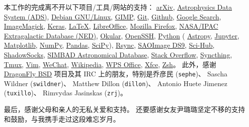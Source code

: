 \begin{thanks}
本工作的完成离不开以下项目/工具/网站的支持：
\href{https://arxiv.org/}{arXiv},
\href{http://ads.harvard.edu/}{Astrophysics Data System (ADS)},
\href{https://www.debian.org/}{Debian GNU/Linux},
\href{https://www.gimp.org/}{GIMP},
\href{https://git-scm.com/}{Git},
\href{https://github.com/}{Github},
\href{https://www.google.com/}{Google Search},
\href{https://imagemagick.org/}{ImageMagick},
\href{https://keras.io/}{Keras},
\href{https://www.latex-project.org/}{\LaTeX},
\href{https://www.libreoffice.org/}{LibreOffice},
\href{https://www.mozilla.org/en-US/firefox/}{Mozilla Firefox},
\href{https://ned.ipac.caltech.edu/}{NASA/IPAC Extragalactic Database (NED)},
\href{https://okular.kde.org/}{Okular},
\href{https://www.openssh.com/}{OpenSSH},
\href{https://www.python.org/}{Python} (%
\href{https://www.astropy.org/}{Astropy},
\href{https://jupyter.org/}{Jupyter},
\href{https://matplotlib.org/}{Matplotlib},
\href{https://www.numpy.org/}{NumPy},
\href{https://pandas.pydata.org/}{Pandas},
\href{https://scipy.org/}{SciPy}),
\href{https://rsync.samba.org/}{Rsync},
\href{http://ds9.si.edu/}{SAOImage DS9},
\href{https://sci-hub.tw/}{Sci-Hub},
\href{https://shadowsocks.org/}{ShadowSocks},
\href{http://simbad.u-strasbg.fr/simbad/}{SIMBAD Astronomical Database},
\href{https://stackoverflow.com/}{Stack Overflow},
\href{https://syncthing.net/}{Syncthing},
\href{https://github.com/tmux/tmux}{Tmux},
\href{https://www.vim.org/}{Vim},
\href{https://www.wechat.com/}{WeChat},
\href{https://www.wikipedia.org/}{Wikipedia},
\href{http://wps-community.org/}{WPS Office},
\href{https://www.xfce.org/}{Xfce},
\href{http://www.zsh.org/}{Zsh}。
此外，感谢 \href{https://www.dragonflybsd.org/}{DragonFly BSD}
项目及其 IRC 上的朋友，特别是乔彦民 (\texttt{sephe})、
Sascha Wildner (\texttt{swildner})、
Matthew Dillon (\texttt{dillon})、
Antonio Huete Jimenez (\texttt{tuxillo})、
Rimvydas Jasinskas (\texttt{zrj})。

最后，感谢父母和亲人的无私关爱和支持。
还要感谢女友尹璐璐坚定不移的支持和鼓励，与我携手走过这段难忘岁月。

\end{thanks}

